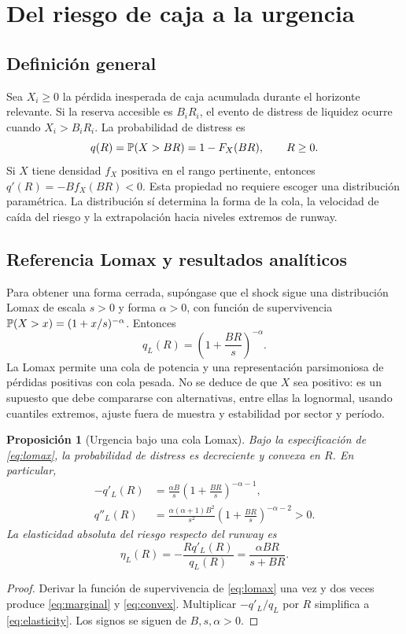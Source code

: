 \documentclass[11pt,a4paper]{article}
\newtheorem{proposition}[theorem]{Proposición}
\begin{document}
\section{Del riesgo de caja a la urgencia}
\subsection{Definición general}
Sea $X_i\geq0$ la pérdida inesperada de caja acumulada durante el horizonte relevante. Si la reserva accesible es $B_iR_i$, el evento de distress de liquidez ocurre cuando $X_i>B_iR_i$. La probabilidad de distress es
\begin{equation}
q(R)=\mathbb P(X>BR)=1-F_X(BR),\qquad R\geq0. \label{eq:qgeneral}
\end{equation}
Si $X$ tiene densidad $f_X$ positiva en el rango pertinente, entonces $q'(R)=-Bf_X(BR)<0$. Esta propiedad no requiere escoger una distribución paramétrica. La distribución sí determina la forma de la cola, la velocidad de caída del riesgo y la extrapolación hacia niveles extremos de runway.

\subsection{Referencia Lomax y resultados analíticos}
Para obtener una forma cerrada, supóngase que el shock sigue una distribución Lomax de escala $s>0$ y forma $\alpha>0$, con función de supervivencia $\mathbb P(X>x)=(1+x/s)^{-\alpha}$. Entonces
\begin{equation}
q_L(R)=\left(1+\frac{BR}{s}\right)^{-\alpha}. \label{eq:lomax}
\end{equation}
La Lomax permite una cola de potencia y una representación parsimoniosa de pérdidas positivas con cola pesada. No se deduce de que $X$ sea positivo: es un supuesto que debe compararse con alternativas, entre ellas la lognormal, usando cuantiles extremos, ajuste fuera de muestra y estabilidad por sector y período.

\begin{proposition}[Urgencia bajo una cola Lomax]
Bajo la especificación de \eqref{eq:lomax}, la probabilidad de distress es decreciente y convexa en $R$. En particular,
\begin{align}
-q'_L(R)&=\frac{\alpha B}{s}\left(1+\frac{BR}{s}\right)^{-\alpha-1}, \label{eq:marginal}\\
q''_L(R)&=\frac{\alpha(\alpha+1)B^2}{s^2}\left(1+\frac{BR}{s}\right)^{-\alpha-2}>0. \label{eq:convex}
\end{align}
La elasticidad absoluta del riesgo respecto del runway es
\begin{equation}
\eta_L(R)=-\frac{R q'_L(R)}{q_L(R)}=\frac{\alpha BR}{s+BR}. \label{eq:elasticity}
\end{equation}
\end{proposition}
\begin{proof}
Derivar la función de supervivencia de \eqref{eq:lomax} una vez y dos veces produce \eqref{eq:marginal} y \eqref{eq:convex}. Multiplicar $-q'_L/q_L$ por $R$ simplifica a \eqref{eq:elasticity}. Los signos se siguen de $B,s,\alpha>0$.\end{proof}
\end{document}
